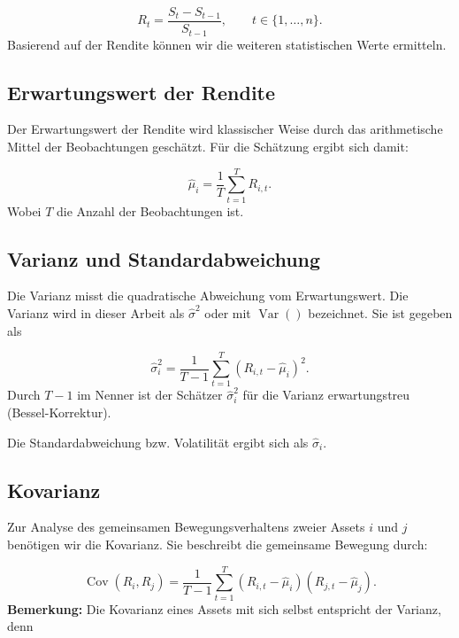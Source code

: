 \documentclass[parskip=half]{scrartcl}
\begin{document}
	\begin{equation}
		R_t = \frac{S_t - S_{t-1}}{S_{t-1}} \label{eq:rendite}, \qquad t \in \{1, \dots, n\}.
	\end{equation} 
	Basierend auf der Rendite können wir die weiteren statistischen Werte ermitteln.
	
	\subsection{Erwartungswert der Rendite}
	Der Erwartungswert der Rendite wird klassischer Weise durch das arithmetische Mittel der Beobachtungen geschätzt. Für die Schätzung ergibt sich damit:
	
	\begin{equation}
		\hat{\mu}_i = \frac{1}{T} \sum_{t=1}^{T} R_{i,t}. \label{eq:erwartungswert}
	\end{equation}
	Wobei $T$ die Anzahl der Beobachtungen ist. \\
	
	\subsection{Varianz und Standardabweichung}
	Die Varianz misst die quadratische Abweichung vom Erwartungswert. Die Varianz wird in dieser Arbeit als $\hat{\sigma}^2$ oder mit $\operatorname{Var}()$ bezeichnet. Sie ist gegeben als
	
	\begin{equation}
		\hat{\sigma}_i^2 = \frac{1}{T-1} \sum_{t=1}^{T} (R_{i,t} - \hat{\mu}_i)^2. \label{eq:varianz}
	\end{equation}
	Durch $T-1$ im Nenner ist der Schätzer $\hat{\sigma}_i^2$ für die Varianz erwartungstreu (Bessel-Korrektur).
	
	Die Standardabweichung bzw. Volatilität ergibt sich als $\hat{\sigma}_i$.
	
	\clearpage
	
	\subsection{Kovarianz}
	Zur Analyse des gemeinsamen Bewegungsverhaltens zweier Assets $i$ und $j$ benötigen wir die Kovarianz. Sie beschreibt die gemeinsame Bewegung durch:
	
	\begin{equation}
		\operatorname{Cov}(R_i,R_j) = \frac{1}{T-1} \sum_{t=1}^{T} (R_{i,t} - \hat{\mu}_i)(R_{j,t} - \hat{\mu}_j). \label{eq:kovarianz}
	\end{equation}
	\textbf{Bemerkung:}
	Die Kovarianz eines Assets mit sich selbst entspricht der Varianz, denn
	
\end{document}
